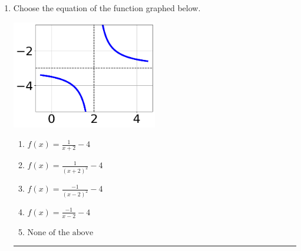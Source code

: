 \documentclass[14pt]{extbook}
\newcommand{\litem}[1]{\item#1\hspace*{-1cm}\rule{\textwidth}{0.4pt}}
\begin{document}
\begin{enumerate}
{\begin{enumerate}[label=\Alph*.]
\end{enumerate} }
\litem{
Choose the equation of the function graphed below.
\begin{center}
    \includegraphics[width=0.5\textwidth]{../Figures/rationalGraphToEquationCopyB.png}
\end{center}
\begin{enumerate}[label=\Alph*.]
\item \( f(x) = \frac{1}{x + 2} - 4 \)
\item \( f(x) = \frac{1}{(x + 2)^2} - 4 \)
\item \( f(x) = \frac{-1}{(x - 2)^2} - 4 \)
\item \( f(x) = \frac{-1}{x - 2} - 4 \)
\item \( \text{None of the above} \)


\end{enumerate}}
\end{enumerate}
\end{document}
